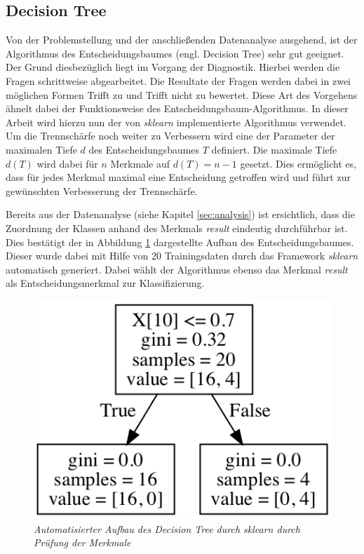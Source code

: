 \subsection{Decision Tree} \label{sec:tree}
Von der Problemstellung und der anschließenden Datenanalyse ausgehend, ist der Algorithmus des Entscheidungsbaumes (engl. \glqq Decision Tree\grqq) sehr gut geeignet. Der Grund diesbezüglich liegt im Vorgang der Diagnostik. Hierbei werden die Fragen schrittweise abgearbeitet. Die Resultate der Fragen werden dabei in zwei möglichen Formen \glqq Trifft zu\grqq{} und \glqq Trifft nicht zu\grqq{} bewertet. Diese Art des Vorgehens ähnelt dabei der Funktionsweise des Entscheidungsbaum-Algorithmus. In dieser Arbeit wird hierzu nun der von \textit{sklearn} implementierte Algorithmus verwendet. Um die Trennschärfe noch weiter zu Verbessern wird eine der Parameter der maximalen Tiefe $d$ des Entscheidungsbaumes $T$ definiert. Die maximale Tiefe $d(T)$ wird dabei für $n$ Merkmale auf $d(T) = n-1$ gesetzt. Dies ermöglicht es, dass für jedes Merkmal maximal eine Entscheidung getroffen wird und führt zur gewünschten Verbesserung der Trennschärfe.

Bereits aus der Datenanalyse (siehe Kapitel \ref{sec:analysis}) ist ersichtlich, dass die Zuordnung der Klassen anhand des Merkmals \textit{result} eindeutig durchführbar ist. Dies bestätigt der in Abbildung \ref{fig:tree_graph} dargestellte Aufbau des Entscheidungsbaumes. Dieser wurde dabei mit Hilfe von 20 Trainingsdaten durch das Framework \textit{sklearn} automatisch generiert. Dabei wählt der Algorithmus ebenso das Merkmal \textit{result} als Entscheidungsmerkmal zur Klassifizierung.

\begin{figure}[h!]
\centering
\includegraphics[scale=0.7]{graphs/tree_graph.png}
\caption{\em Automatisierter Aufbau des Decision Tree durch \glqq sklearn\grqq{} durch Prüfung der Merkmale}
\label{fig:tree_graph}
\end{figure}